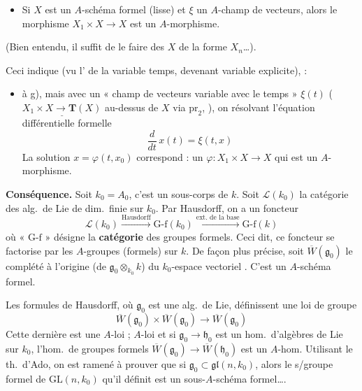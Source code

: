 \documentclass[11pt,a4paper]{article}
\begin{document}

\begin{itemize}
  \item[g)] Si $X$ est un $A$-schéma formel (lisse) et $\xi$ un $A$-champ de
    vecteurs, alors le morphisme $X_1 \times X \to X$ est un $A$-morphisme.
\end{itemize}

(Bien entendu, il suffit de le faire  des $X$ de la forme
$X_n$\ldots).

Ceci indique (vu l' de la variable temps, devenant
variable explicite), \ill{} :

\begin{itemize}
  \item[g$'$)]   à g), mais avec un « champ de
    vecteurs variable avec le temps » $\xi(t)$ \quad
    ($\underline{X_1 \times X \to \mathbf{T}(X)}$ au-dessus de $X$ via
    $\mathrm{pr}_2$, ), on résolvant l'équation
    différentielle formelle
    \[
      \frac{d}{dt}\, x(t) = \xi(t, x)
    \]
    La solution $x = \varphi(t, x_0)$ correspond : un
    $\varphi : X_1 \times X \to X$ qui est un $A$-morphisme.
\end{itemize}


\textbf{Conséquence.} Soit $k_0 = A_0$, c'est un sous-corps de $k$. Soit
$\mathcal{L}(k_0)$ la catégorie des alg.\ de Lie de dim.\ finie sur $k_0$. Par
Hausdorff, on a un foncteur
\[
  \mathcal{L}(k_0) \xrightarrow{\text{Hausdorff}} \mathrm{G\text{-}f}(k_0)
  \xrightarrow{\text{ext.\ de la base}} \mathrm{G\text{-}f}(k)
\]
où « $\mathrm{G\text{-}f}$ » désigne la \textbf{catégorie} des groupes formels.
Ceci dit, ce foncteur se factorise par les $A$-groupes (formels) sur $k$. De
façon plus précise, soit $\overline{W}(\mathfrak{g}_0)$ le complété à l'origine
(de $\mathfrak{g}_0 \otimes_{k_0} k$) \struck{\ill{}} du $k_0$-espace vectoriel
. C'est un $A$-schéma formel.

Les formules de Hausdorff, où $\mathfrak{g}_0$ est une alg.\ de Lie,
définissent une loi de groupe
\[
  \overline{W}(\mathfrak{g}_0) \times \overline{W}(\mathfrak{g}_0) \to
  \overline{W}(\mathfrak{g}_0)
\]
Cette dernière est une $A$-loi ;   $A$-loi et si
$\mathfrak{g}_0 \to \mathfrak{h}_0$ est un hom.\ d'algèbres de Lie sur $k_0$,
l'hom.\ de groupes formels
$\overline{W}(\mathfrak{g}_0) \to \overline{W}(\mathfrak{h}_0)$ est un $A$-hom.
Utilisant le th.\ d'Ado, on est ramené à prouver que si
$\mathfrak{g}_0 \subset \mathfrak{gl}(n, k_0)$, alors le s/groupe formel de
$\mathrm{GL}(n, k_0)$ qu'il définit est un sous-$A$-schéma formel….
\end{document}
